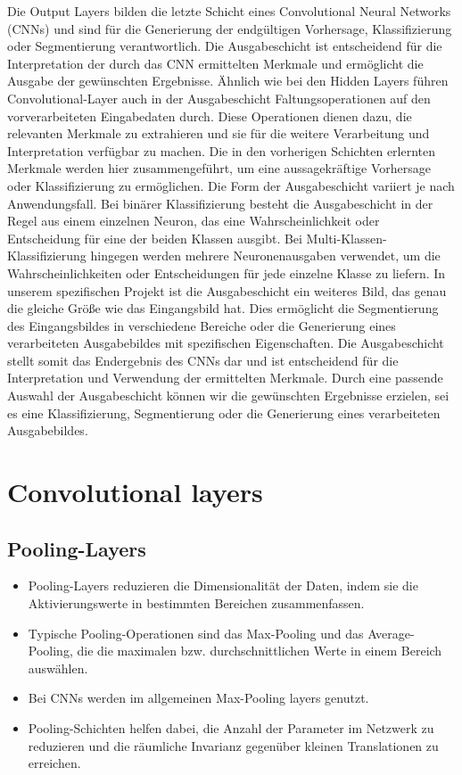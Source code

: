 Die Output Layers bilden die letzte Schicht eines Convolutional Neural Networks (CNNs) und sind für die Generierung der endgültigen Vorhersage, Klassifizierung oder Segmentierung verantwortlich. 
Die Ausgabeschicht ist entscheidend für die Interpretation der durch das CNN ermittelten Merkmale und ermöglicht die Ausgabe der gewünschten Ergebnisse.
Ähnlich wie bei den Hidden Layers führen Convolutional-Layer auch in der Ausgabeschicht Faltungsoperationen auf den vorverarbeiteten Eingabedaten durch. 
Diese Operationen dienen dazu, die relevanten Merkmale zu extrahieren und sie für die weitere Verarbeitung und Interpretation verfügbar zu machen. Die in den vorherigen Schichten erlernten Merkmale werden hier zusammengeführt, um eine aussagekräftige Vorhersage oder Klassifizierung zu ermöglichen.
Die Form der Ausgabeschicht variiert je nach Anwendungsfall. Bei binärer Klassifizierung besteht die Ausgabeschicht in der Regel aus einem einzelnen Neuron, das eine Wahrscheinlichkeit oder Entscheidung für eine der beiden Klassen ausgibt. 
Bei Multi-Klassen-Klassifizierung hingegen werden mehrere Neuronenausgaben verwendet, um die Wahrscheinlichkeiten oder Entscheidungen für jede einzelne Klasse zu liefern.
In unserem spezifischen Projekt ist die Ausgabeschicht ein weiteres Bild, das genau die gleiche Größe wie das Eingangsbild hat. 
Dies ermöglicht die Segmentierung des Eingangsbildes in verschiedene Bereiche oder die Generierung eines verarbeiteten Ausgabebildes mit spezifischen Eigenschaften.
Die Ausgabeschicht stellt somit das Endergebnis des CNNs dar und ist entscheidend für die Interpretation und Verwendung der ermittelten Merkmale. 
Durch eine passende Auswahl der Ausgabeschicht können wir die gewünschten Ergebnisse erzielen, sei es eine Klassifizierung, Segmentierung oder die Generierung eines verarbeiteten Ausgabebildes.

\section{Convolutional layers}

\subsection{Pooling-Layers}
\begin{itemize}
  \item Pooling-Layers reduzieren die Dimensionalität der Daten, indem sie die Aktivierungswerte in bestimmten Bereichen zusammenfassen.
  \item Typische Pooling-Operationen sind das Max-Pooling und das Average-Pooling, die die maximalen bzw. durchschnittlichen Werte in einem Bereich auswählen.
  \item Bei CNNs werden im allgemeinen Max-Pooling layers genutzt.
  \item Pooling-Schichten helfen dabei, die Anzahl der Parameter im Netzwerk zu reduzieren und die räumliche Invarianz gegenüber kleinen Translationen zu erreichen.
\end{itemize}

